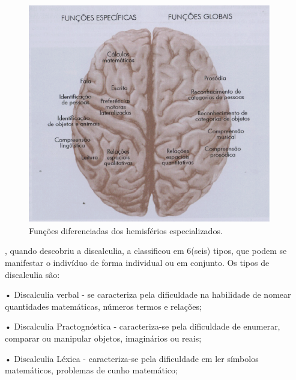 \documentclass[
	12pt,				%
    oneside,			%
	a4paper,			%
	english,			%
	french,				%
	spanish,			%
	brazil,				%
	]{abntex2}
\begin{document}
\begin{figure} [hbt] 
\label{figura1} 
\caption{Funções diferenciadas dos hemisférios especializados.}
\includegraphics[width=0.95\textwidth]{cerebro.png} %
\end{figure}



\cite{Kosk}, quando descobriu a discalculia, a classificou em 6(seis) tipos, que podem se manifestar o indivíduo de forma individual ou em conjunto. Os tipos de discalculia são:

•   Discalculia verbal - se caracteriza pela dificuldade na habilidade de nomear quantidades matemáticas, números termos e relações;

•	Discalculia Practognóstica - caracteriza-se pela dificuldade de enumerar, comparar ou manipular objetos, imaginários ou reais;

•	Discalculia Léxica - caracteriza-se pela dificuldade em ler símbolos matemáticos, problemas de cunho matemático;
\end{document}

